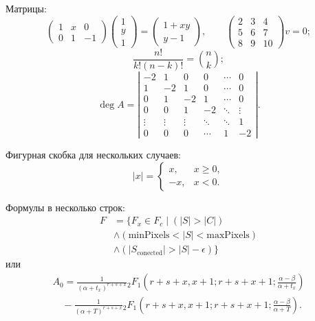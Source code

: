 Матрицы:
\begin{equation}
    \begin{pmatrix}
        1 & x & 0 \\
        0 & 1 & -1
    \end{pmatrix}
    \begin{pmatrix}
        1  \\
        y  \\
        1
    \end{pmatrix}
    =
    \begin{pmatrix}
        1 + xy  \\
        y - 1
    \end{pmatrix},
    \quad\quad
    \left(
    \begin{matrix}
        2 & 3 & 4\\
        5 & 6 & 7\\
        8 & 9 & 10
    \end{matrix}
    \right)
    v = 0;
\end{equation}
\begin{equation}
    \frac{n!}{k!(n-k)!} = \binom{n}{k};
\end{equation}
\begin{equation}
    \deg A =
    \left|
    \begin{matrix}
        -2 & 1 & 0 & 0 & \cdots & 0  \\
        1 & -2 & 1 & 0 & \cdots & 0  \\
        0 & 1 & -2 & 1 & \cdots & 0  \\
        0 & 0 & 1 & -2 & \ddots & \vdots \\
        \vdots & \vdots & \vdots & \ddots & \ddots & 1  \\
        0 & 0 & 0 & \cdots & 1 & -2
    \end{matrix}
    \right|.
\end{equation}

Фигурная скобка для нескольких случаев:
\begin{equation}
    |x| =
    \begin{cases}
        x, & x \ge 0, \\
        -x, & x< 0.
    \end{cases}
\end{equation}

Формулы в несколько строк:
\begin{align}
    F &= \{ F_{x} \in F_{c} \mid (|S| > |C|) \\
      &\wedge (\mathrm{minPixels} < |S| < \mathrm{maxPixels}) \\
      &\wedge (|S_{\mathrm{conected}}| > |S| - \epsilon) \}
\end{align}
или
\begin{multline}
    A_0 = \frac{1}{(\alpha + t_x)^{r + s + x}}{}_2 F_1 \left( r + s + x, x + 1; r + s + x + 1; \frac{\alpha - \beta}{\alpha + t_x} \right) \\
    \quad - \frac{1}{(\alpha + T)^{r + s + x}}{}_2 F_1 \left( r + s + x, x + 1; r + s + x + 1; \frac{\alpha - \beta}{\alpha + T} \right).
\end{multline}

